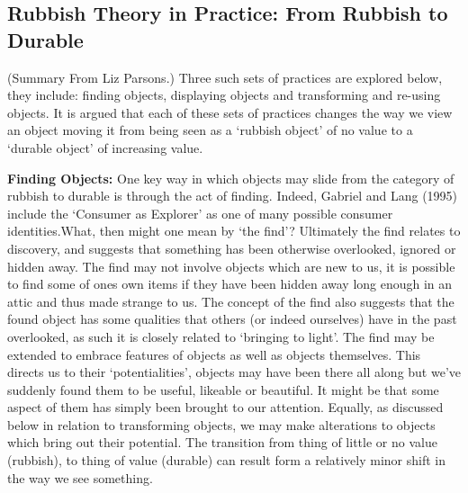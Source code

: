 



%
%
\subsection{Rubbish Theory in Practice: From Rubbish to Durable}
(Summary From Liz Parsons.) 
Three such sets of practices are explored below, they include: finding objects, displaying objects and transforming and re-using objects. It is argued that each of these sets of practices changes the way we view an object moving it from being seen as a ‘rubbish object’ of no value to a ‘durable object’ of increasing value.

\textbf{Finding Objects:} One key way in which objects may slide from the category of rubbish to durable is through the act of finding. Indeed, Gabriel and Lang (1995) include the ‘Consumer as Explorer’ as one of many possible consumer identities.What, then might one mean by ‘the find’? Ultimately the find relates to discovery, and suggests that something has been otherwise overlooked, ignored or hidden away. The find may not involve objects which are new to us, it is possible to find some of ones own items if they have been hidden away long enough in an attic and thus made strange to us. The concept of the find also suggests that the found object has some qualities that others (or indeed ourselves) have in the past overlooked, as such it is closely related to ‘bringing to light’. The find may be extended to embrace features of objects as well as objects themselves. This directs us to their ‘potentialities’, objects may have been there all along but we’ve suddenly found them to be useful, likeable or beautiful. It might be that some aspect of them has simply been brought to our attention. Equally, as discussed below in relation to transforming objects, we may make alterations to objects which bring out their potential. The transition from thing of little or no value (rubbish), to thing of value (durable) can result form a relatively minor shift in the way we see something.




